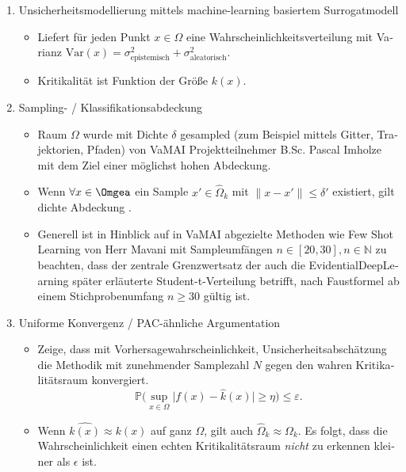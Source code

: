 \begin{otherlanguage}{ngerman}
\begin{enumerate}
  \item Unsicherheitsmodellierung mittels machine-learning basiertem Surrogatmodell
  \begin{itemize}
    \item Liefert für jeden Punkt $x \in \Omega$ eine Wahrscheinlichkeitsverteilung mit Varianz $\mathrm{Var}(x) = \sigma^{2}_{\text{epistemisch}} + \sigma^{2}_{\text{aleatorisch}}$.
    \item Kritikalität ist Funktion der Größe $k(x)$.
  \end{itemize}
  \item Sampling- / Klassifikationsabdeckung
  \begin{itemize}
    \item Raum $\Omega$ wurde mit Dichte $\delta$ gesampled (zum Beispiel mittels Gitter, Trajektorien, Pfaden) von VaMAI Projektteilnehmer B.Sc. Pascal Imholze mit dem Ziel einer möglichst hohen Abdeckung.
    \item Wenn $\forall x \in \Omgea$ ein Sample $x' \in \widehat{\Omega}_k$ mit $\lVert x - x' \rVert \le \delta'$ existiert, gilt \glqq dichte Abdeckung \grqq.
    \item Generell ist in Hinblick auf in VaMAI abgezielte Methoden wie \glqq{}Few Shot Learning\grqq{} von Herr Mavani mit Sampleumfängen $n \in [20, 30], n \in \mathbb{N}$ zu beachten, dass der zentrale Grenzwertsatz der auch die \gls{EvidentialDeepLearning} später erläuterte Student-t-Verteilung betrifft, nach Faustformel ab einem Stichprobenumfang $n \geq 30$ gültig ist. %
  \end{itemize}
  \item Uniforme Konvergenz / PAC-ähnliche Argumentation
  \begin{itemize}
    \item Zeige, dass mit Vorhersagewahrscheinlichkeit, Unsicherheitsabschätzung die Methodik mit zunehmender Samplezahl $N$ gegen den wahren Kritikalitätsraum konvergiert. 
    \[
    \mathbb{P}\bigl( \sup_{x \in \Omega} \bigl\lvert f(x) - \widehat{k}(x) \bigr\rvert \ge \eta \bigr) \le \varepsilon.
    \]
    \item Wenn $\widehat{k(x)} \approx k(x)$ auf ganz $\Omega$, gilt auch $\widehat{\Omega}_{k} \approx \Omega_{k}$. Es folgt, dass die Wahrscheinlichkeit einen echten Kritikalitätsraum \textit{nicht} zu erkennen kleiner als $\epsilon$ ist.
  \end{itemize}

\end{enumerate}




\end{otherlanguage}
